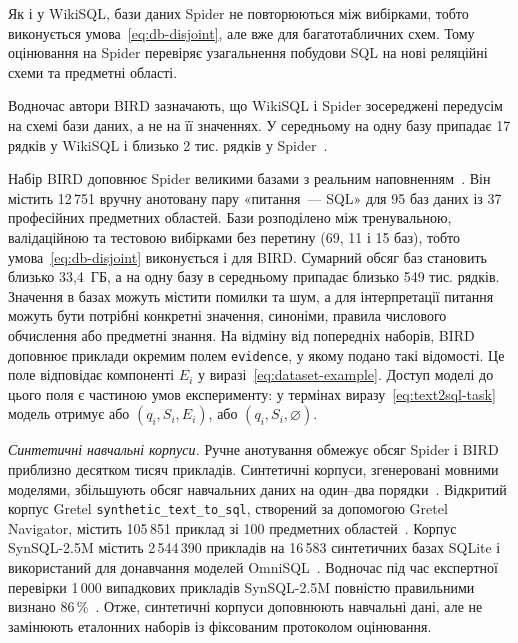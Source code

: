 \documentclass[a4paper,14pt,oneside]{extreport}
\begin{document}
Як і у WikiSQL, бази даних Spider не повторюються між вибірками, тобто виконується умова~\eqref{eq:db-disjoint}, але вже для багатотабличних схем. Тому оцінювання на Spider перевіряє узагальнення побудови SQL на нові реляційні схеми та предметні області.

Водночас автори BIRD зазначають, що WikiSQL і Spider зосереджені передусім на схемі бази даних, а не на її значеннях. У середньому на одну базу припадає 17 рядків у WikiSQL і близько 2 тис. рядків у Spider~\cite{li2023bird}.

Набір BIRD доповнює Spider великими базами з реальним наповненням~\cite{li2023bird}. Він містить 12\,751 вручну анотовану пару «питання~--- SQL» для 95 баз даних із 37 професійних предметних областей. Бази розподілено між тренувальною, валідаційною та тестовою вибірками без перетину (69, 11 і 15 баз), тобто умова~\eqref{eq:db-disjoint} виконується і для BIRD. Сумарний обсяг баз становить близько 33,4~ГБ, а на одну базу в середньому припадає близько 549 тис. рядків. Значення в базах можуть містити помилки та шум, а для інтерпретації питання можуть бути потрібні конкретні значення, синоніми, правила числового обчислення або предметні знання. На відміну від попередніх наборів, BIRD доповнює приклади окремим полем \texttt{evidence}, у якому подано такі відомості. Це поле відповідає компоненті \(E_i\) у виразі~\eqref{eq:dataset-example}. Доступ моделі до цього поля є частиною умов експерименту: у термінах виразу~\eqref{eq:text2sql-task} модель отримує або \((q_i,S_i,E_i)\), або \((q_i,S_i,\varnothing)\).

\textit{Синтетичні навчальні корпуси.}
Ручне анотування обмежує обсяг Spider і BIRD приблизно десятком тисяч прикладів. Синтетичні корпуси, згенеровані мовними моделями, збільшують обсяг навчальних даних на один--два порядки~\cite{liu2025survey,li2025omnisql}. Відкритий корпус Gretel \texttt{synthetic\_text\_to\_sql}, створений за допомогою Gretel Navigator, містить 105\,851 приклад зі 100 предметних областей~\cite{gretel2024synth}. Корпус \mbox{SynSQL-2.5M} містить 2\,544\,390 прикладів на 16\,583 синтетичних базах SQLite і використаний для донавчання моделей OmniSQL~\cite{li2025omnisql}. Водночас під час експертної перевірки 1\,000 випадкових прикладів SynSQL-2.5M повністю правильними визнано 86\,\%~\cite{li2025omnisql}. Отже, синтетичні корпуси доповнюють навчальні дані, але не замінюють еталонних наборів із фіксованим протоколом оцінювання.
\end{document}
